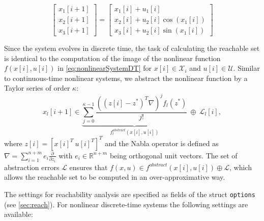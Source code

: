 \begin{center}
\begin{minipage}[t]{0.48\textwidth}
	\vspace{10pt}
	\begin{equation*}
	\begin{bmatrix} x_1[i+1] \\ x_2[i+1] \\ x_3[i+1] \end{bmatrix} = \begin{bmatrix} x_1[i] + u_1[i] \\ x_2[i] + u_2[i] \cos(x_1[i]) \\ x_3[i] + u_2[i] \sin(x_1[i]) \end{bmatrix}
\end{equation*}
\end{minipage}
\begin{minipage}[t]{0.48\textwidth}
	\footnotesize
	
\end{minipage}
\end{center}






Since the system evolves in discrete time, the task of calculating the reachable set is identical to the computation of the image of the nonlinear function $f(x[i],u[i])$ in \eqref{eq:nonlinearSystemDT} for $x[i] \in \mathcal{X}_i$ and $u[i] \in \mathcal{U}$. Similar to continuous-time nonlinear systems, we abstract the nonlinear function by a Taylor series of order $\kappa$:
\begin{equation} \label{eq:taylorSeriesDT}
 x_l[i+1] \in \underbrace{\sum_{j=0}^{\kappa - 1} \frac{\left((z[i]-z^*)^T \nabla \right)^j f_l(z^*)}{j!}}_{f_l^{abstract}(x[i],u[i])} ~\oplus ~\mathcal{L}_l[i],
\end{equation}
where $z[i] = [x[i]^T~u[i]^T]^T$ and the Nabla operator is defined as $\nabla = \sum_{i=1}^{n+m} e_i \frac{\partial}{\partial z_i}$ with $e_i \in \mathbb{R}^{n+m}$ being orthogonal unit vectors. The set of abstraction errors $\mathcal{L}$ ensures that $f(x,u)\in f^{abstract}(x[i],u[i]) \oplus \mathcal{L}$, which allows the reachable set to be computed in an over-approximative way. 

The settings for reachability analysis are specified as fields of the struct \texttt{options} (see \cref{sec:reach}). For nonlinear discrete-time systems the following settings are available:

